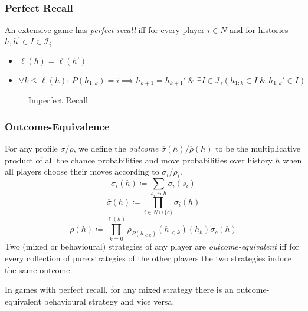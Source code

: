 \documentclass[UTF8,11pt,colorlinks,compress,openany]{beamer}%
\begin{document}
\begin{frame}\frametitle{Perfect Recall}
\begin{definition}
	An extensive game has \emph{perfect recall} iff for every player $i\in N$ and for histories $h,h^\prime\in I\in\mathcal{I}_i$
\begin{itemize}
	\item $\ell(h)=\ell(h')$
	\item $\forall k\leq \ell(h):\,P(h_{1:k})=i\implies h_{k+1}=h_{k+1}'\;\&\;\exists I\in\mathcal{I}_i(h_{1:k}\in I\;\&\;h_{1:k}'\in I)$
\end{itemize}
\end{definition}
\begin{figure}[H]
\caption{Imperfect Recall}
\end{figure}
\end{frame}

\begin{frame}\frametitle{Outcome-Equivalence}
For any profile $\sigma/\rho$, we define the \emph{outcome} $\overline{\sigma}(h)/\overline{\rho}(h)$ to be the multiplicative product of all the chance probabilities and move probabilities over history $h$ when all players choose their moves according to $\sigma_i/\rho_i$.
\[\sigma_i(h)\coloneqq \sum\limits_{s_i\leadsto h}\sigma_i(s_i)\]
\[\overline{\sigma}(h)\coloneqq \prod\limits_{i\in N\cup\{c\}}\sigma_i(h)\]
\[\overline{\rho}(h)\coloneqq \prod\limits_{k=0}^{\ell(h)}\rho_{P(h_{<k})}(h_{<k})(h_k)\sigma_c(h)\]
Two (mixed or behavioural) strategies of any player are \emph{outcome-equivalent} iff for every collection of pure strategies of the other players the two strategies induce the same outcome.
\begin{theorem}
	In games with perfect recall, for any mixed strategy there is an outcome-equivalent behavioural strategy and vice versa.
\end{theorem}
\end{frame}
\end{document}
